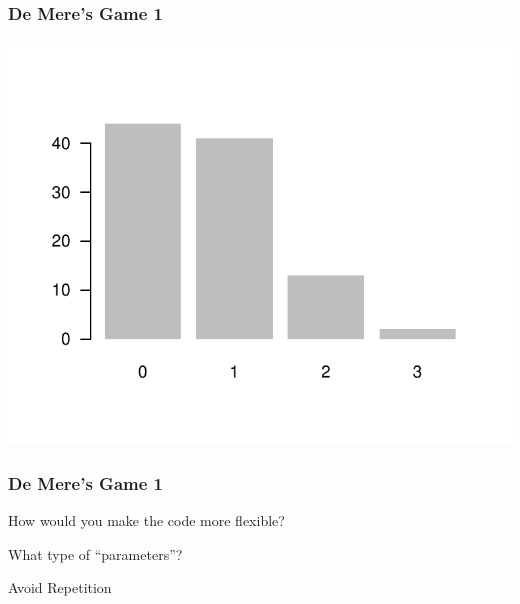 \documentclass[12pt]{beamer}\usepackage[]{graphicx}\usepackage[]{color}
\newenvironment{knitrout}{}{} %
\begin{document}

\begin{frame}[fragile]
\frametitle{De Mere's Game 1}

\begin{knitrout}\footnotesize
{}\color{fgcolor}

{\centering \includegraphics[width=.7\linewidth,height=.6\linewidth]{figure/unnamed-chunk-39-1} 

}



\end{knitrout}

\end{frame}


\begin{frame}[fragile]
\frametitle{De Mere's Game 1}

\bbi
  \item How would you make the code more flexible?
  \item What type of ``parameters''?
  \item Avoid Repetition
\ei
\eb

\end{frame}

\end{document}

